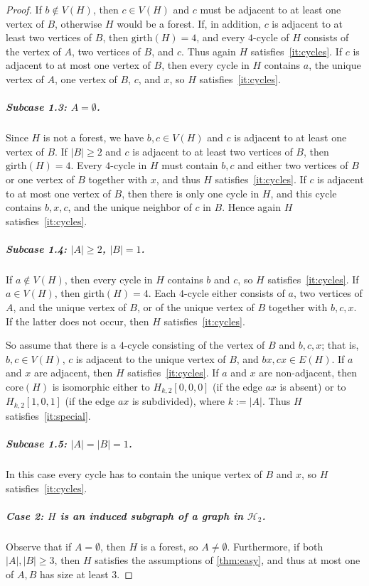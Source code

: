 \documentclass[a4paper,UKenglish,cleveref, autoref, thm-restate]{lipics-v2021}
\newcommand{\girth}{\mathrm{girth}}
\newcommand{\cH}{\mathcal{H}}
\newcommand{\core}{\mathrm{core}}
\begin{document}
\begin{proof}
If $b\notin V(H)$, then $c\in V(H)$ and $c$ must be adjacent to at least one vertex of $B$, otherwise $H$ would be a forest.
If, in addition, $c$ is adjacent to at least two vertices of $B$, then $\girth(H)=4$, and every $4$-cycle of $H$ consists of the vertex of $A$, two vertices of $B$, and $c$.
Thus again $H$ satisfies~\ref{it:cycles}.
If $c$ is adjacent to at most one vertex of $B$, then every cycle in $H$ contains $a$, the unique vertex of $A$, one vertex of $B$, $c$, and $x$, so $H$ satisfies~\ref{it:cycles}.

\subparagraph*{Subcase 1.3: \boldmath $A=\emptyset$.}
Since $H$ is not a forest, we have $b,c\in V(H)$ and $c$ is adjacent to at least one vertex of $B$.
If $|B|\geq 2$ and $c$ is adjacent to at least two vertices of $B$, then $\girth(H)=4$.
Every $4$-cycle in $H$ must contain $b,c$ and either two vertices of $B$ or one vertex of $B$ together with $x$, and thus $H$ satisfies~\ref{it:cycles}.
If $c$ is adjacent to at most one vertex of $B$, then there is only one cycle in $H$, and this cycle contains $b,x,c$, and the unique neighbor of $c$ in $B$.
Hence again $H$ satisfies~\ref{it:cycles}.

\subparagraph*{Subcase 1.4: \boldmath $|A|\geq 2$, $|B|=1$.}
If $a\notin V(H)$, then every cycle in $H$ contains $b$ and $c$, so $H$ satisfies~\ref{it:cycles}.
If $a\in V(H)$, then $\girth(H)=4$.
Each $4$-cycle either consists of $a$, two vertices of $A$, and the unique vertex of $B$, or of the unique vertex of $B$ together with $b,c,x$.
If the latter does not occur, then $H$ satisfies~\ref{it:cycles}.

So assume that there is a $4$-cycle consisting of the vertex of $B$ and $b,c,x$; that is, $b,c\in V(H)$, $c$ is adjacent to the unique vertex of $B$, and $bx,cx\in E(H)$.
If $a$ and $x$ are adjacent, then $H$ satisfies~\ref{it:cycles}.
If $a$ and $x$ are non-adjacent, then $\core(H)$ is isomorphic either to $H_{k,2}[0,0,0]$ (if the edge $ax$ is absent) or to $H_{k,2}[1,0,1]$ (if the edge $ax$ is subdivided), where $k:=|A|$.
Thus $H$ satisfies~\ref{it:special}.

\subparagraph*{Subcase 1.5: \boldmath $|A|=|B|=1$.}
In this case every cycle has to contain the unique vertex of $B$ and $x$, so $H$ satisfies~\ref{it:cycles}.

\subparagraph*{Case 2: \boldmath $H$ is an induced subgraph of a graph in $\cH_2$.}
Observe that if $A=\emptyset$, then $H$ is a forest, so $A\neq \emptyset$.
Furthermore, if both $|A|,|B|\geq 3$, then $H$ satisfies the assumptions of \cref{thm:easy}, and thus at most one of $A,B$ has size at least $3$.


\end{proof}
\end{document}
